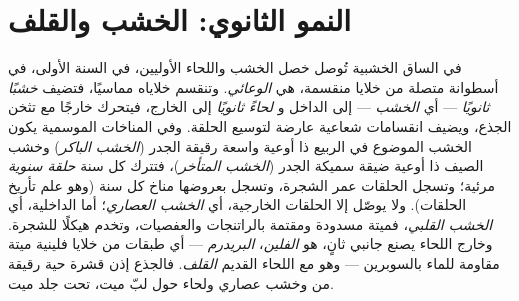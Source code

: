 \section{النمو الثانوي: الخشب والقلف}

\begin{definition}\label{def:b2:plant-meristems:wood}
في الساق الخشبية تُوصل خصل الخشب واللحاء الأوليين،
في السنة الأولى، في أسطوانة متصلة من خلايا منقسمة، هي
\emph{ الوعائي}. وتنقسم خلاياه مماسيًا، فتضيف
\emph{خشبًا ثانويًا} --- أي \emph{الخشب} --- إلى الداخل و
\emph{لحاءً ثانويًا} إلى الخارج، فيتحرك 
خارجًا مع تثخن الجذع، ويضيف انقسامات شعاعية عارضة
لتوسيع الحلقة. وفي المناخات الموسمية يكون الخشب الموضوع
في الربيع ذا أوعية واسعة رقيقة الجدر (\emph{الخشب الباكر}) وخشب
الصيف ذا أوعية ضيقة سميكة الجدر (\emph{الخشب المتأخر})، فتترك كل
سنة \emph{حلقة سنوية} مرئية؛ وتسجل الحلقات
عمر الشجرة، وتسجل بعروضها مناخ كل سنة
(وهو علم تأريخ الحلقات). ولا يوصّل إلا الحلقات الخارجية، أي \emph{الخشب
العصاري}؛ أما الداخلية، أي \emph{الخشب القلبي}، فميتة مسدودة
ومقتمة بالراتنجات والعفصيات، وتخدم هيكلًا
للشجرة. وخارج اللحاء يصنع  جانبي ثانٍ، هو
\emph{ الفلين}، \emph{البريدرم} --- أي طبقات من خلايا فلينية
ميتة مقاومة للماء بالسوبرين --- وهو مع اللحاء القديم
\emph{القلف}. فالجذع إذن قشرة حية رقيقة من
 وخشب عصاري ولحاء حول لبّ ميت، تحت جلد ميت.
\end{definition}

